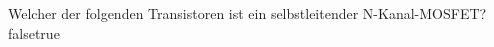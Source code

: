     {Welcher der folgenden Transistoren ist ein selbstleitender N-Kanal-MOSFET?}
    {}
    {}
    {}
    {}
    {false}{true}